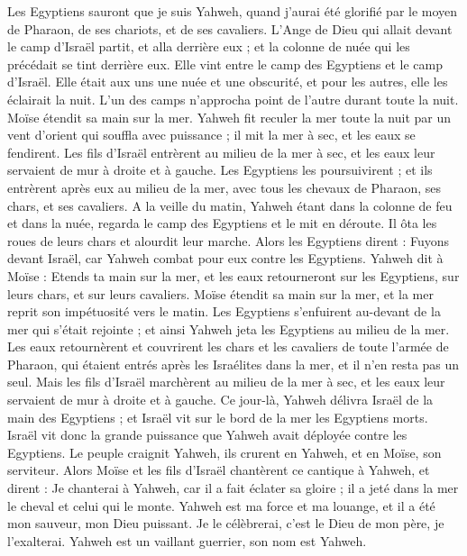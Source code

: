 \begin{multicols}{2}
Les Egyptiens sauront que je suis Yahweh, quand j'aurai été glorifié par le moyen de Pharaon, de ses chariots, et de ses cavaliers.
L'Ange de Dieu qui allait devant le camp d'Israël partit, et alla derrière eux ; et la colonne de nuée qui les précédait se tint derrière eux.
Elle vint entre le camp des Egyptiens et le camp d'Israël. Elle était aux uns une nuée et une obscurité, et pour les autres, elle les éclairait la nuit. L'un des camps n'approcha point de l'autre durant toute la nuit.
Moïse étendit sa main sur la mer. Yahweh fit reculer la mer toute la nuit par un vent d'orient qui souffla avec puissance ; il mit la mer à sec, et les eaux se fendirent\FTNT{}.
Les fils d'Israël entrèrent au milieu de la mer à sec, et les eaux leur servaient de mur à droite et à gauche.
Les Egyptiens les poursuivirent ; et ils entrèrent après eux au milieu de la mer, avec tous les chevaux de Pharaon, ses chars, et ses cavaliers.
A la veille du matin, Yahweh étant dans la colonne de feu et dans la nuée, regarda le camp des Egyptiens et le mit en déroute.
Il ôta les roues de leurs chars et alourdit leur marche. Alors les Egyptiens dirent : Fuyons devant Israël, car Yahweh combat pour eux contre les Egyptiens.
Yahweh dit à Moïse : Etends ta main sur la mer, et les eaux retourneront sur les Egyptiens, sur leurs chars, et sur leurs cavaliers.
Moïse étendit sa main sur la mer, et la mer reprit son impétuosité vers le matin. Les Egyptiens s'enfuirent au-devant de la mer qui s'était rejointe ; et ainsi Yahweh jeta les Egyptiens au milieu de la mer.
Les eaux retournèrent et couvrirent les chars et les cavaliers de toute l'armée de Pharaon, qui étaient entrés après les Israélites dans la mer, et il n'en resta pas un seul.
Mais les fils d'Israël marchèrent au milieu de la mer à sec, et les eaux leur servaient de mur à droite et à gauche.
Ce jour-là, Yahweh délivra Israël de la main des Egyptiens ; et Israël vit sur le bord de la mer les Egyptiens morts.
Israël vit donc la grande puissance que Yahweh avait déployée contre les Egyptiens. Le peuple craignit Yahweh, ils crurent en Yahweh, et en Moïse, son serviteur.
\VerseOne{}Alors Moïse et les fils d'Israël chantèrent ce cantique à Yahweh, et dirent : Je chanterai à Yahweh, car il a fait éclater sa gloire ; il a jeté dans la mer le cheval et celui qui le monte.
Yahweh est ma force et ma louange, et il a été mon sauveur, mon Dieu puissant. Je le célèbrerai, c'est le Dieu de mon père, je l'exalterai.
Yahweh est un vaillant guerrier, son nom est Yahweh.

\end{multicols}
